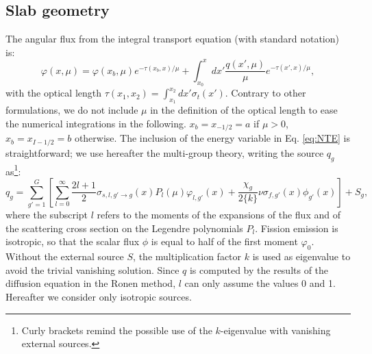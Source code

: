 \documentclass{ictt26}
\begin{document}
\subsection{Slab geometry}
\label{sec:slab}
The angular flux from the integral transport equation (with standard notation) is:
\begin{equation}
\varphi(x, \mu) = \varphi(x_b, \mu) e^{-\tau(x_b, x)/\mu} + \int_{x_0}^x {dx' \frac{q(x', \mu)}{\mu} e^{-\tau(x', x)/\mu}},
\label{eq:NTE}
\end{equation}
with the optical length $\tau(x_1, x_2) = \int_{x_1}^{x_2}{dx' \sigma_t(x')}$. Contrary to other formulations, we do not include $\mu$ in the definition of the optical length to ease the numerical integrations in the following. $x_b = x_{-1/2} = a$ if $\mu > 0$, $x_b = x_{I-1/2} = b$ otherwise. The inclusion of the energy variable in Eq. \ref{eq:NTE} is straightforward; we use hereafter the multi-group theory, writing the source $q_g$ as\footnote{Curly brackets remind the possible use of the $k$-eigenvalue with vanishing external sources.}:
\begin{equation*}
q_g = \sum_{g'=1}^G{\left[
  \sum_{l=0}^\infty{ \frac{2l+1}{2}\sigma_{s,l, g' \rightarrow g}(x)P_l(\mu)\varphi_{l,g'}(x)
  + \frac{\chi_g}{2\{k\}} \nu\sigma_{f,g'}(x)\phi_{g'}(x)}\right] + S_g
                 },
\end{equation*}
where the subscript $l$ refers to the moments of the expansions of the flux and of the scattering cross section on the Legendre polynomials $P_l$. Fission emission is isotropic, so that the scalar flux $\phi$ is equal to half of the first moment $\varphi_0$. Without the external source $S$, the multiplication factor $k$ is used as eigenvalue to avoid the trivial vanishing solution. Since $q$ is computed by the results of the diffusion equation in the Ronen method, $l$ can only assume the values 0 and 1. Hereafter we consider only isotropic sources.
\end{document}
